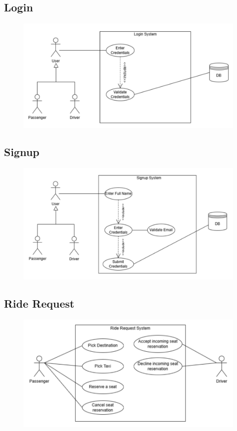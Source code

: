 \documentclass[a4paper,12pt]{article}
\begin{document}
  \subsection*{Login}
    \begin{figure}[H]
      \centering
      \includegraphics[width=1\textwidth]{Login.png} 
    \end{figure}
  \subsection*{Signup}
    \begin{figure}[H]
      \centering
      \includegraphics[width=1\textwidth]{SignUp.png} 
    \end{figure}
  \subsection*{Ride Request}
    \begin{figure}[H]
      \centering
      \includegraphics[width=1\textwidth]{RideRequest.png} 
    \end{figure}
\end{document}
